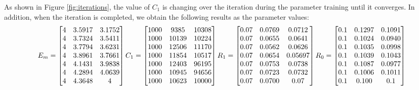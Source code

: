 As shown in Figure \ref{fig:iterations}, the value of $C_1$ is changing over the iteration during the parameter training until it converges. In addition, when the iteration is completed, we obtain the following results as the parameter values:
 \begin{equation*}

E_m=
  \begin{bmatrix}
    4 & 3.5917 & 3.1752 \\
    4 & 3.7324 & 3.5411 \\
    4 & 3.7794 & 3.6231 \\
    4 & 3.8961 & 3.7661 \\
    4 & 4.1431 & 3.9838 \\
    4 & 4.2894 & 4.0639 \\
    4 & 4.3648 & 4
  \end{bmatrix}
C_1=
  \begin{bmatrix}
    1000 & 9385 & 10308 \\
    1000 & 10139 & 10224 \\
    1000 & 12506 & 11170 \\
    1000 & 11854 & 10517 \\
    1000 & 12403 & 96195 \\
    1000 & 10945 & 94656 \\
    1000 & 10623 & 10000
  \end{bmatrix}
  
 \\
  R_1=
  \begin{bmatrix}
    0.07 & 0.0769 & 0.0712 \\
    0.07 & 0.0655 & 0.0641 \\
    0.07 & 0.0562 & 0.0626 \\
    0.07 & 0.0654 & 0.05697 \\
    0.07 & 0.0753 & 0.0738 \\
    0.07 & 0.0723 & 0.0732 \\
    0.07 & 0.0700 & 0.07
  \end{bmatrix}
  R_0=
  \begin{bmatrix}
    0.1 & 0.1297 & 0.1091 \\
    0.1 & 0.1024 & 0.0940 \\
    0.1 & 0.1035 & 0.0998 \\
    0.1 & 0.1039 & 0.1043 \\
    0.1 & 0.1087 & 0.0977 \\
    0.1 & 0.1006 & 0.1011 \\
    0.1 & 0.100 & 0.1
  \end{bmatrix}
 \end{equation*}
 

